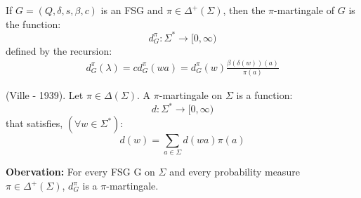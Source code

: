 \documentclass[../main.tex]{subfiles}
\begin{document}
\begin{defn}
    If $G = (Q, \delta, s, \beta, c)$ is an FSG and $\pi \in \Delta^{+}(\Sigma)$,
then the $\pi$-martingale of $G$ is the function:
\begin{equation*}
    d^{\pi}_{G}: \Sigma^{*} \rightarrow [0, \infty)
\end{equation*}
defined by the recursion:
\begin{align*}
    d^{\pi}_{G}(\lambda) = c
    d^{\pi}_{G}(wa) = d^{\pi}_{G}(w) \frac{\beta(\delta(w))(a)}{\pi(a)}
\end{align*}
\end{defn}

\begin{defn}
    (Ville - 1939). Let $\pi \in \Delta(\Sigma)$. A $\pi$-martingale on $\Sigma$
is a function:
\begin{equation*}
    d: \Sigma^{*} \rightarrow [0, \infty)
\end{equation*}
that satisfies, $(\forall w \in \Sigma^{*})$:
\begin{equation}
    d(w) = \sum_{a \in \Sigma} d(wa)\pi(a)
\end{equation}
\end{defn}

\textbf{Obervation:}
    For every FSG G on $\Sigma$ and every probability measure $\pi \in \Delta^{+}(\Sigma)$,
$d^{\pi}_{G}$ is a $\pi$-martingale.
\end{document}

